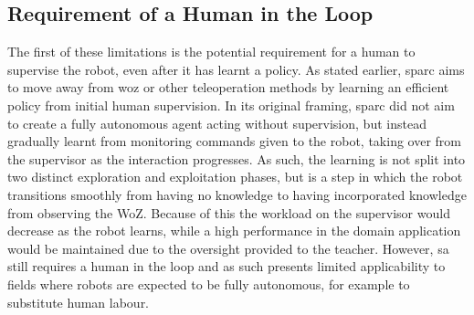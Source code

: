 \subsection{Requirement of a Human in the Loop}

The first of these limitations is the potential requirement for a human to supervise the robot, even after it has learnt a policy. As stated earlier, \gls{sparc} aims to move away from \gls{woz} or other teleoperation methods by learning an efficient policy from initial human supervision. In its original framing, \gls{sparc} did not aim to create a fully autonomous agent acting without supervision, but instead gradually learnt from monitoring commands given to the robot, taking over from the supervisor as the interaction progresses. As such, the learning is not split into two distinct exploration and exploitation phases, but is a step in which the robot transitions smoothly from having no knowledge to having incorporated knowledge from observing the WoZ. Because of this the workload on the supervisor would decrease as the robot learns, while a high performance in the domain application would be maintained due to the oversight provided to the teacher. However, \gls{sa} still requires a human in the loop and as such presents limited applicability to fields where robots are expected to be fully autonomous, for example to substitute human labour. 


